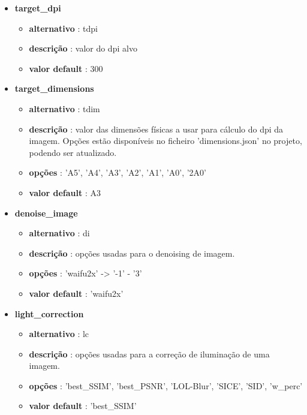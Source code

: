 \begin{itemize}
	\item \textbf{target\_dpi}
		\begin{itemize}\setlength\itemsep{-0.5em}
			\vspace{-1em}
			\item \textbf{alternativo} : tdpi
			\item \textbf{descrição} : valor do dpi alvo
			\item \textbf{valor default} : 300
		\end{itemize}
	
	\item \textbf{target\_dimensions}
		\begin{itemize}\setlength\itemsep{-0.5em}
			\vspace{-1em}
			\item \textbf{alternativo} : tdim
			\item \textbf{descrição} : valor das dimensões físicas a usar para cálculo do dpi da imagem. Opções estão disponíveis no ficheiro 'dimensions.json' no projeto, podendo ser atualizado.
			\item \textbf{opções} : 'A5', 'A4', 'A3', 'A2', 'A1', 'A0', '2A0'
			\item \textbf{valor default} : A3
		\end{itemize}
	
	\item \textbf{denoise\_image}
		\begin{itemize}\setlength\itemsep{-0.5em}
			\vspace{-1em}
			\item \textbf{alternativo} : di
			\item \textbf{descrição} : opções usadas para o denoising de imagem.
			\item \textbf{opções} : 'waifu2x' -> '-1' - '3'
			\item \textbf{valor default} : 'waifu2x'
		\end{itemize}
	
	\item \textbf{light\_correction}
		\begin{itemize}\setlength\itemsep{-0.5em}
			\vspace{-1em}
			\item \textbf{alternativo} : lc
			\item \textbf{descrição} : opções usadas para a correção de iluminação de uma imagem.
			\item \textbf{opções} : 'best\_SSIM', 'best\_PSNR', 'LOL-Blur', 'SICE', 'SID', 'w\_perc'
			\item \textbf{valor default} : 'best\_SSIM'
		\end{itemize}
		

\end{itemize}

